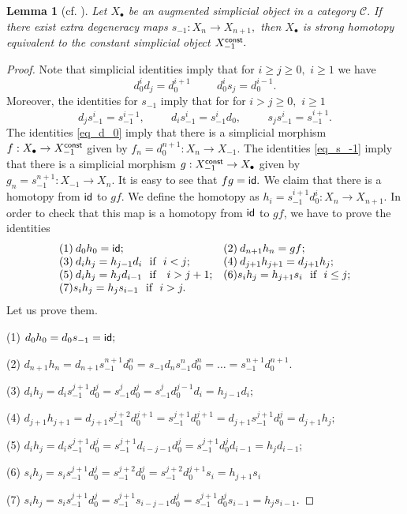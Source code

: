 \documentclass{amsart}
\numberwithin{equation}{section}
\newtheorem{lemma}[theorem]{Lemma}
\theoremstyle{definition}
\def\CC{\mathcal{C}}
\begin{document}
\begin{lemma}[{cf. \cite[Th. 4.3]{barr2019contractible}}]
Let $X_\bullet$ be an augmented simplicial object in a category $\CC.$ If there exist extra degeneracy maps $s_{-1}:X_{n}\to X_{n+1},$ then $X_\bullet$ is strong homotopy equivalent to the constant simplicial object $X_{-1}^{\sf const}.$
\end{lemma}
\begin{proof}
Note that simplicial identities imply that for $i\geq j\geq 0,$  $i\geq 1$   we have 
\begin{equation}\label{eq_d_0}
  d_0^id_j=d_0^{i+1} \hspace{1cm} d_0^is_j=d_0^{i-1}.  
\end{equation}
Moreover, the identities for $s_{-1}$ imply that for for $i> j\geq 0,$  $i\geq 1$
\begin{equation}\label{eq_s_-1}
d_js_{-1}^i=s_{-1}^{i-1}, 
 \hspace{1cm} d_i s_{-1}^i=s_{-1}^i d_0,
 \hspace{1cm}
s_js_{-1}^i=s_{-1}^{i+1}.
\end{equation}
The identities  \eqref{eq_d_0} imply that there is a simplicial morphism  $f:X_\bullet\to X_{-1}^{\sf const}$ given by $f_n=d_0^{n+1}:X_n\to X_{-1}.$ 
The identities \eqref{eq_s_-1} imply that there is a simplicial morphism  $g:X_{-1}^{\sf const}\to X_\bullet$ given by $g_n=s_{-1}^{n+1}:X_{-1}\to X_n.$ 
It is easy to see that $fg={\sf id}.$ 
We claim that there is a homotopy  from ${\sf id}$ to $gf.$ We define the homotopy as $h_i=s_{-1}^{i+1}d_0^i:X_n\to X_{n+1}.$ 
In order to check that this map is a homotopy from ${\sf id}$ to $gf$, we have to prove the identities
$$
\begin{array}{ll}
 (1)\: d_0h_0={\sf id}; 
&
(2)\: d_{n+1}h_n=gf; 
\\
(3)\: d_ih_j=h_{j-1}d_i \text{\ \ if\ \ } i<j; 
&
(4)\: d_{j+1}h_{j+1}=d_{j+1}h_j; \\
(5)\: d_ih_j=h_jd_{i-1} \text{\ \ if \ \ } i>j+1;
& 
(6) s_ih_j=h_{j+1}s_i \text{\ \ if\ \ } i\leq j; 
\\
(7) s_ih_j=h_js_{i-1} \text{\ \  if\ \ } i>j. & 
\end{array}
$$
Let  us prove them.

(1) $d_0h_0=d_0s_{-1}={\sf id};$

(2) $d_{n+1}h_n=d_{n+1}s_{-1}^{n+1}d_0^n=s_{-1} d_n s_{-1}^{n} d_0^n = \dots = s_{-1}^{n+1} d_0^{n+1}.$ 

(3) $d_ih_j=d_i s_{-1}^{j+1}d_0^j=s_{-1}^{j} d_0^j=s_{-1}^j d_0^{j-1}d_i=h_{j-1}d_i;$ 

(4) $d_{j+1}h_{j+1}=d_{j+1} s_{-1}^{j+2}d_0^{j+1} = s_{-1}^{j+1}d_0^{j+1}= d_{j+1}s_{-1}^{j+1}d_0^j=d_{j+1} h_j;$

(5) $d_ih_j=d_is_{-1}^{j+1}d_0^j=s_{-1}^{j+1} d_{i-j-1} d_0^j = s_{-1}^{j+1} d_0^j d_{i-1} = h_jd_{i-1};$

(6) $s_ih_j=s_is_{-1}^{j+1} d_0^j = s_{-1}^{j+2} d_0^j= s_{-1}^{j+2} d_0^{j+1}s_i=h_{j+1}s_i$

(7) $s_ih_j=s_is_{-1}^{j+1}d_0^j=s_{-1}^{j+1}s_{i-j-1}d_0^j=s_{-1}^{j+1}d_0^js_{i-1}=h_js_{i-1}.$
\end{proof}
\end{document}
